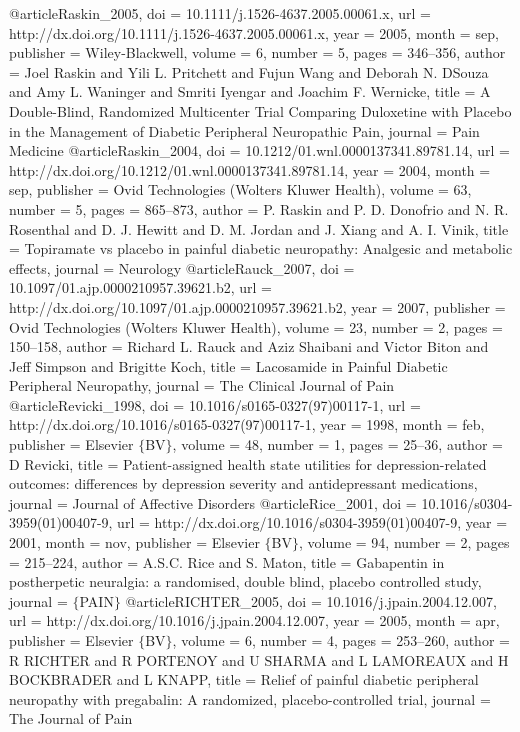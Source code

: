 @article{Raskin_2005,
	doi = {10.1111/j.1526-4637.2005.00061.x},
	url = {http://dx.doi.org/10.1111/j.1526-4637.2005.00061.x},
	year = 2005,
	month = {sep},
	publisher = {Wiley-Blackwell},
	volume = {6},
	number = {5},
	pages = {346--356},
	author = {Joel Raskin and Yili L. Pritchett and Fujun Wang and Deborah N. D{\textquotesingle}Souza and Amy L. Waninger and Smriti Iyengar and Joachim F. Wernicke},
	title = {A Double-Blind, Randomized Multicenter Trial Comparing Duloxetine with Placebo in the Management of Diabetic Peripheral Neuropathic Pain},
	journal = {Pain Medicine}
}
@article{Raskin_2004,
	doi = {10.1212/01.wnl.0000137341.89781.14},
	url = {http://dx.doi.org/10.1212/01.wnl.0000137341.89781.14},
	year = 2004,
	month = {sep},
	publisher = {Ovid Technologies (Wolters Kluwer Health)},
	volume = {63},
	number = {5},
	pages = {865--873},
	author = {P. Raskin and P. D. Donofrio and N. R. Rosenthal and D. J. Hewitt and D. M. Jordan and J. Xiang and A. I. Vinik},
	title = {Topiramate vs placebo in painful diabetic neuropathy: Analgesic and metabolic effects},
	journal = {Neurology}
}
@article{Rauck_2007,
	doi = {10.1097/01.ajp.0000210957.39621.b2},
	url = {http://dx.doi.org/10.1097/01.ajp.0000210957.39621.b2},
	year = 2007,
	publisher = {Ovid Technologies (Wolters Kluwer Health)},
	volume = {23},
	number = {2},
	pages = {150--158},
	author = {Richard L. Rauck and Aziz Shaibani and Victor Biton and Jeff Simpson and Brigitte Koch},
	title = {Lacosamide in Painful Diabetic Peripheral Neuropathy},
	journal = {The Clinical Journal of Pain}
}
@article{Revicki_1998,
	doi = {10.1016/s0165-0327(97)00117-1},
	url = {http://dx.doi.org/10.1016/s0165-0327(97)00117-1},
	year = 1998,
	month = {feb},
	publisher = {Elsevier $\lbrace$BV$\rbrace$},
	volume = {48},
	number = {1},
	pages = {25--36},
	author = {D Revicki},
	title = {Patient-assigned health state utilities for depression-related outcomes: differences by depression severity and antidepressant medications},
	journal = {Journal of Affective Disorders}
}
@article{Rice_2001,
	doi = {10.1016/s0304-3959(01)00407-9},
	url = {http://dx.doi.org/10.1016/s0304-3959(01)00407-9},
	year = 2001,
	month = {nov},
	publisher = {Elsevier $\lbrace$BV$\rbrace$},
	volume = {94},
	number = {2},
	pages = {215--224},
	author = {A.S.C. Rice and S. Maton},
	title = {Gabapentin in postherpetic neuralgia: a randomised, double blind, placebo controlled study},
	journal = {$\lbrace$PAIN$\rbrace$}
}
@article{RICHTER_2005,
	doi = {10.1016/j.jpain.2004.12.007},
	url = {http://dx.doi.org/10.1016/j.jpain.2004.12.007},
	year = 2005,
	month = {apr},
	publisher = {Elsevier $\lbrace$BV$\rbrace$},
	volume = {6},
	number = {4},
	pages = {253--260},
	author = {R RICHTER and R PORTENOY and U SHARMA and L LAMOREAUX and H BOCKBRADER and L KNAPP},
	title = {Relief of painful diabetic peripheral neuropathy with pregabalin: A randomized, placebo-controlled trial},
	journal = {The Journal of Pain}
}
